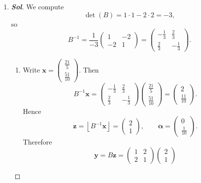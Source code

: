 \begin{enumerate}
\begin{proof}[\normalfont\color{magenta}\bfseries Sol]
			\emph{Remark.} Because \(\mathcal P(B)\) is defined using \([0,1)^2\), it is a half-open parallelogram. Geometrically, however, these are the four corner points of its closure.
	\end{proof}
	\newpage
	\item\begin{proof}[\normalfont\color{magenta}\bfseries Sol]
	We compute
	\[
	\det(B)=1\cdot 1-2\cdot 2=-3,
	\]
	so
	\[
	B^{-1}
	=
	\frac1{-3}
	\begin{pmatrix}
			1&-2\\
			-2&1
		\end{pmatrix}
	=
	\begin{pmatrix}
			-\frac13&\frac23\\[4pt]
			\frac23&-\frac13
		\end{pmatrix}.
	\]
	\begin{enumerate}
		\item Write $
		\mathbf x=
		\begin{pmatrix}
			\frac{21}{5}\\[2pt]
			\frac{51}{10}
		\end{pmatrix}$.
		Then
		\[
		B^{-1}\mathbf x
		=
		\begin{pmatrix}
			-\frac13&\frac23\\[4pt]
			\frac23&-\frac13
		\end{pmatrix}
		\begin{pmatrix}
			\frac{21}{5}\\[2pt]
			\frac{51}{10}
		\end{pmatrix}
		=
		\begin{pmatrix}
			2\\[2pt]
			\frac{11}{10}
		\end{pmatrix}.
		\]
		Hence
		\[
		\mathbf z=\left\lfloor B^{-1}\mathbf x\right\rfloor
		=
		\begin{pmatrix}
			2\\
			1
		\end{pmatrix},
		\qquad
		\boldsymbol\alpha
		=
		\begin{pmatrix}
			0\\[2pt]
			\frac1{10}
		\end{pmatrix}.
		\]
		Therefore
		\[
		\mathbf y=B\mathbf z
		=
		\begin{pmatrix}
			1&2\\
			2&1
		\end{pmatrix}
		\begin{pmatrix}
			2\\
			1
		\end{pmatrix}
\]
\end{enumerate}
\end{proof}
\end{enumerate}
